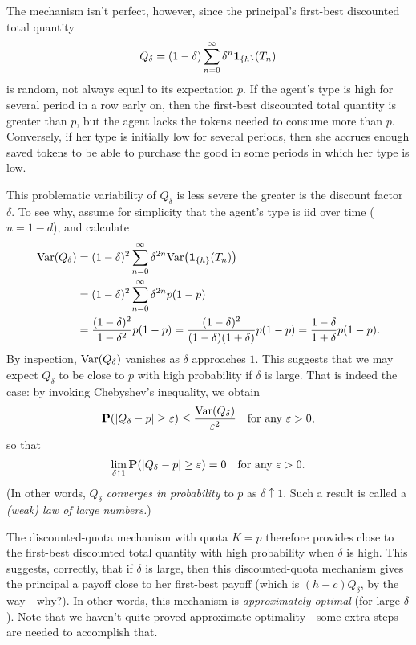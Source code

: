 The mechanism isn't perfect, however, since the principal's first-best discounted total quantity
%
\begin{equation*}
	Q_\delta = (1-\delta) \sum_{n=0}^\infty \delta^n \boldsymbol{1}_{\{h\}}(T_n)
\end{equation*}
%
is random, not always equal to its expectation $p$.
If the agent's type is high for several period in a row early on, then the first-best discounted total quantity is greater than $p$,
but the agent lacks the tokens needed to consume more than $p$.
Conversely, if her type is initially low for several periods, then she accrues enough saved tokens to be able to purchase the good in some periods in which her type is low.

This problematic variability of $Q_\delta$ is less severe the greater is the discount factor $\delta$.
To see why,
assume for simplicity that the agent's type is iid over time ($u=1-d$),
and calculate
%
\begin{align*}
	\Var( Q_\delta )
	&= (1-\delta)^2 \sum_{n=0}^\infty
	\delta^{2n} \Var\left( \1_{\{h\}}(T_n) \right)
	\\
	&= (1-\delta)^2 \sum_{n=0}^\infty
	\delta^{2n} p (1-p)
	\\
	&= \frac{ (1-\delta)^2 }{ 1 - \delta^2 } p (1-p)
	= \frac{ (1-\delta)^2 }{ (1-\delta) (1+\delta) } p (1-p)
	= \frac{ 1-\delta }{ 1+\delta } p (1-p) .
\end{align*}
%
By inspection, $\mathrm{Var}( Q_\delta )$ vanishes as $\delta$ approaches $1$.
This suggests that we may expect $Q_\delta$ to be close to $p$
with high probability if $\delta$ is large.
That is indeed the case: by invoking Chebyshev's inequality, we obtain
%
\begin{equation*}
	\PP\left( \abs*{ Q_\delta - p } \geq \eps \right)
	\leq \frac{ \Var( Q_\delta ) }{ \eps^2 } 
	\quad \text{for any $\eps>0$,}
\end{equation*}
%
so that
%
\begin{equation*}
	\lim_{\delta \uparrow 1 } \PP( \abs*{ Q_\delta - p } \geq \eps )
	= 0
	\quad \text{for any $\eps>0$.}
\end{equation*}
%
(In other words, $Q_\delta$ \emph{converges in probability} to $p$ as $\delta \uparrow 1$.
Such a result is called a \emph{(weak) law of large numbers.})

The discounted-quota mechanism with quota $K=p$
therefore provides close to the first-best discounted total quantity
with high probability when $\delta$ is high.
This suggests, correctly, that if $\delta$ is large, then this discounted-quota mechanism gives the principal a payoff close to her first-best payoff (which is $(h-c) Q_\delta$, by the way---why?).
In other words, this mechanism is \emph{approximately optimal} (for large $\delta$).
Note that we haven't quite proved approximate optimality---some extra steps are needed to accomplish that.



